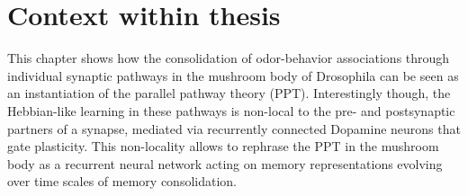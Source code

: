 


\graphicspath{{chapter_drosophila/figures/}}

\section{Context within thesis}

This chapter shows how the consolidation of odor-behavior associations through individual synaptic pathways in the mushroom body of Drosophila can be seen as an instantiation of the parallel pathway theory (PPT). Interestingly though, the Hebbian-like learning in these pathways is non-local to the pre- and postsynaptic partners of a synapse, mediated via recurrently connected Dopamine neurons that gate plasticity. This non-locality allows to rephrase the PPT in the mushroom body as a recurrent neural network acting on memory representations evolving over time scales of memory consolidation.

%
%
%
%

